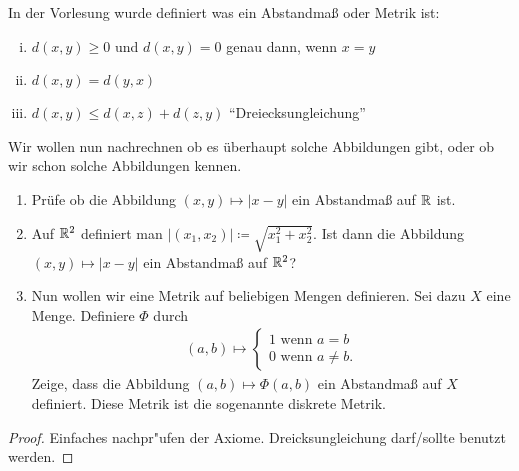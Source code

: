 \documentclass[a4paper,10pt]{article}
\begin{document}
\begin{Aufg}
 In der Vorlesung wurde definiert was ein Abstandmaß oder Metrik ist:
 \begin{enumerate}[(i)]
  \item $d(x, y) \geq 0 $ und $d(x,y) =0$ genau dann, wenn $x=y$
  \item $d(x,y) = d(y,x)$
  \item $d(x,y) \leq d(x,z) + d(z,y)$ ``Dreiecksungleichung''
 \end{enumerate}
 
 Wir wollen nun nachrechnen ob es überhaupt solche Abbildungen gibt,
 oder ob wir schon solche Abbildungen kennen. 
 \begin{enumerate}
  \item Prüfe ob die Abbildung $(x,y) \mapsto |x-y|$ ein Abstandmaß auf $\mathbb{R}$ ist.
  \item Auf $\mathbb{R}^2$ definiert man $|(x_1, x_2)| \coloneqq \sqrt{x_1 ^2 + x_2 ^2}$.
	Ist dann die Abbildung $(x,y) \mapsto |x-y|$ ein Abstandmaß auf $\mathbb{R}^2$?
  \item Nun wollen wir eine Metrik auf beliebigen Mengen definieren. Sei dazu $X$
	eine Menge. Definiere $\Phi$ durch
  \begin{gather*}
   (a,b)\mapsto \begin{cases}
            1  \text{ wenn } a=b \\
            0  \text{ wenn } a\neq b.
            \end{cases}
  \end{gather*}
 Zeige, dass die Abbildung $(a,b) \mapsto \Phi(a,b)$ ein Abstandmaß auf $X$ definiert. 
 Diese Metrik ist die sogenannte diskrete Metrik.
  
 \end{enumerate}

\end{Aufg}
 
\begin{proof}
 Einfaches nachpr"ufen der Axiome. Dreicksungleichung darf/sollte benutzt werden.
 
\end{proof}
\end{document}

